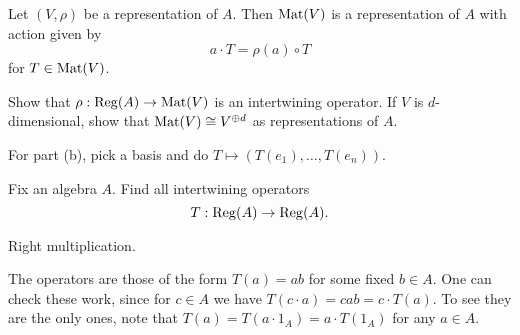 \begin{sproblem}
	\label{prob:reg_mat}
	Let $(V, \rho)$ be a representation of $A$.
	Then $\mathrm{Mat}(V)$ is a representation of $A$
	with action given by 
	\[ a \cdot T = \rho(a) \circ T \]
	for $T \in \mathrm{Mat}(V)$.
	\begin{enumerate}[(a)]
		\ii Show that $\rho : \operatorname{Reg}(A) \to \mathrm{Mat}(V)$ is an intertwining operator.
		\ii If $V$ is $d$-dimensional, show that $\mathrm{Mat}(V) \cong V^{\oplus d}$
		as representations of $A$.
	\end{enumerate}
	\begin{hint}
		For part (b), pick a basis and do $T \mapsto (T(e_1), \dots, T(e_n))$.
	\end{hint}
\end{sproblem}

\begin{sproblem}
	\label{prob:regA_intertwine}
	Fix an algebra $A$.
	Find all intertwining operators 
	\[ T : \operatorname{Reg}(A) \to \operatorname{Reg}(A). \]
	\begin{hint}
		Right multiplication.
	\end{hint}
	\begin{sol}
		The operators are those of the form $T(a) = ab$
		for some fixed $b \in A$.
		One can check these work, since for $c \in A$
		we have $T(c \cdot a) = cab = c \cdot T(a)$.
		To see they are the only ones, note that
		$T(a) = T(a \cdot 1_A) = a \cdot T(1_A)$ for any $a \in A$.
	\end{sol}
\end{sproblem}
